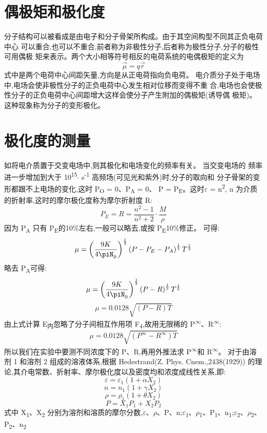\documentclass[11pt]{report}
\begin{document}
\section{偶极矩和极化度}
\label{sec:org937c065}
分子结构可以被看成是由电子和分子骨架所构成。由于其空间构型不同其正负电荷中心
可以重合,也可以不重合,前者称为非极性分子,后者称为极性分子,分子的极性可用偶极
矩来表示。两个大小相等符号相反的电荷系统的电偶极矩的定义为
\[
\vec{\mu}= q\vec{r}
\]
式中是两个电荷中心间距矢量,方向是从正电荷指向负电荷。
电介质分子处于电场中,电场会使非极性分子的正负电荷中心发生相对位移而变得不重
合,电场也会使极性分子的正负电荷中心间距增大这样会使分子产生附加的偶极矩(诱导偶
极矩)。这种现象称为分子的变形极化。
\section{极化度的测量}
\label{sec:org4ff51db}
如将电介质置于交变电场中,则其极化和电场变化的频率有关。
当交变电场的 频率进一步增加到大于 10\textsuperscript{15}\(\cdot\) s\textsuperscript{-1} 高频场(可见光和紫外)时,分子的取向和
分子骨架的变形都跟不上电场的变化,这时 P\textsubscript{O} = 0、P\textsubscript{A} = 0、 P = P\textsubscript{E}。这时\(\varepsilon\) = n\textsuperscript{2},
n 为介质的折射率,这时的摩尔极化度称为摩尔折射度 R:
\[
P_{E}=R=\frac{n^{2}-1}{n^{2}+2}\cdot \frac{M}{\rho}
\]
因为 P\textsubscript{A} 只有 P\textsubscript{E}的10\%左右,一般可以略去,或按 P\textsubscript{E}10\%修正。
可得:
\[
\mu=\left(\frac{9K}{4\piN_{0}}\right)^{\frac{1}{2}}\left(P-P_{E}-P_{A}\right)^{\frac{1}{2}}T^{\frac{1}{2}}
\]
略去 P\textsubscript{A}可得:
\[
\mu=\left(\frac{9K}{4\piN_{0}}\right)^{\frac{1}{2}}\left(P-R\right)^{\frac{1}{2}}T^{\frac{1}{2}}
\]
\[
\mu=0.0128\sqrt{(P-R)T}
\]
由上式计算 E\textsubscript{内}忽略了分子间相互作用项 F\textsubscript{4},故用无限稀的 P\textsuperscript{\(\infty\)}、R\textsuperscript{\(\infty\)}:
\[
\mu=0.0128\sqrt{(P^{\infty}-R^{\infty})T}
\]
所以我们在实验中要测不同浓度下的 P、R,再用外推法求 P\textsuperscript{\(\infty\)}和 R\textsuperscript{\(\infty\)}。
对于由溶剂 1 和溶剂 2 组成的溶液体系,根据 Hedestrand(Z. Phys. Cnem.,2438(1929))
的理论,其介电常数、折射率、摩尔极化度以及密度均和浓度成线性关系,即:
\[
\varepsilon =\varepsilon_{1}(1+\alpha X_{2})
\]
\[
n =n_{1}(1+\gamma X_{2})
\]
\[
\rho =\rho_{1}(1+\theta X_{2})
\]
\[
P =X_{1}P_{1}+X_{2}P_{2}
\]
式中 X\textsubscript{1}、X\textsubscript{2} 分别为溶剂和溶质的摩尔分数,\(\varepsilon\)、\(\rho\)、P、n;\(\varepsilon\)\textsubscript{1}、\(\rho\)\textsubscript{1}、P\textsubscript{1}、n\textsubscript{1};\(\varepsilon\)\textsubscript{2}、\(\rho\)\textsubscript{2}、P\textsubscript{2}、n\textsubscript{2}
\end{document}
